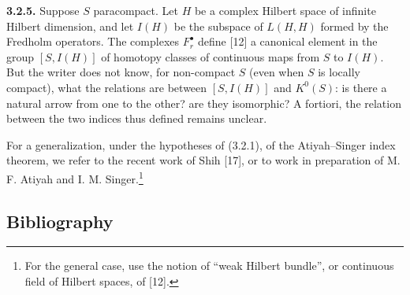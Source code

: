 \documentclass[11pt]{article}
\begin{document}
\textbf{3.2.5.} Suppose $S$ paracompact. Let $H$ be a complex Hilbert space of infinite Hilbert dimension, and let $I(H)$ be the subspace of $L(H,H)$ formed by the Fredholm operators. The complexes $F_r^\bullet$ define [12] a canonical element in the group $[S,I(H)]$ of homotopy classes of continuous maps from $S$ to $I(H)$. But the writer does not know, for non-compact $S$ (even when $S$ is locally compact), what the relations are between $[S,I(H)]$ and $K^0(S)$: is there a natural arrow from one to the other? are they isomorphic? A fortiori, the relation between the two indices thus defined remains unclear.

For a generalization, under the hypotheses of (3.2.1), of the Atiyah--Singer index theorem, we refer to the recent work of Shih [17], or to work in preparation of M. F. Atiyah and I. M. Singer.\footnote{For the general case, use the notion of ``weak Hilbert bundle'', or continuous field of Hilbert spaces, of [12].}

\subsection*{Bibliography}
\end{document}
